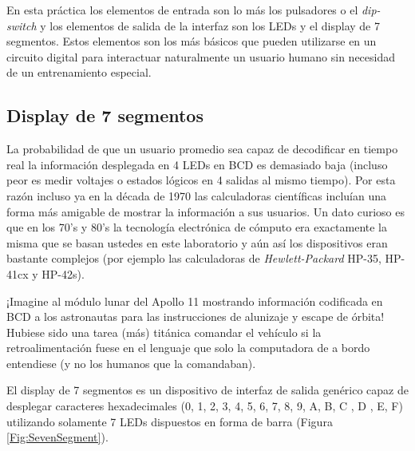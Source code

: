 En esta práctica los elementos de entrada son lo más los pulsadores o el \emph{dip-switch} y los elementos de salida de la interfaz son los LEDs y el display de 7 segmentos.
Estos elementos son los más básicos que pueden utilizarse en un circuito digital para interactuar naturalmente un usuario humano sin necesidad de un entrenamiento especial.

\subsection{Display de 7 segmentos}
La probabilidad de que un usuario promedio sea capaz de decodificar en tiempo real la información desplegada en 4 LEDs en BCD 
es demasiado baja (incluso peor es medir voltajes o estados lógicos en 4 salidas al mismo tiempo).
Por esta razón incluso ya en la década de 1970 las calculadoras científicas incluían una forma más amigable de mostrar
la información a sus usuarios. Un dato curioso es que en los 70's y 80's la tecnología electrónica de cómputo era exactamente la misma
que se basan ustedes en este laboratorio y aún así los dispositivos eran bastante complejos (por ejemplo las calculadoras de \emph{Hewlett-Packard} HP-35, HP-41cx y HP-42s).

¡Imagine al módulo lunar del Apollo 11 mostrando información codificada en BCD a los astronautas para las instrucciones de alunizaje y escape de órbita!
Hubiese sido una tarea (más) titánica comandar el vehículo si la retroalimentación fuese en el lenguaje que solo la computadora de a bordo entendiese (y no los humanos que la comandaban).

\vspace{14pt}

El display de 7 segmentos es un dispositivo de interfaz de salida genérico capaz de desplegar caracteres hexadecimales (0, 1, 2, 3, 4, 5, 6, 7, 8, 9, A, B, C , D , E, F) utilizando solamente
7 LEDs dispuestos en forma de barra (Figura \ref{Fig:SevenSegment}).

